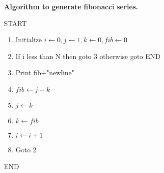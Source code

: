 \documentclass{article}
\begin{document}
\begin{center}
\Huge{\bf {Algorithm to generate fibonacci series.}}
\end{center}
\vspace{1.5in}
\Large
START
\begin{enumerate}
\item Initialize $i \gets 0, j \gets 1, k \gets 0, fib \gets 0$
\item If i less than N then goto 3 otherwise goto END
\item Print fib+"newline"
\item $fib \gets j + k$
\item $j \gets k$
\item $k \gets fib$
\item $i \gets i + 1$
\item Goto 2




\end{enumerate}
END
\end{document}
